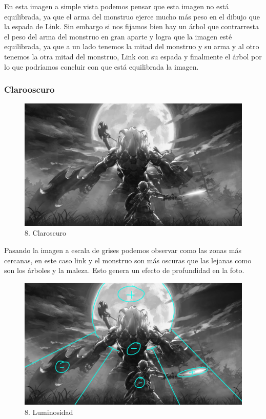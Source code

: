 \documentclass[12pt]{article}
\begin{document}
En esta imagen a simple vista podemos pensar que esta imagen no está equilibrada, ya que el arma del monstruo ejerce mucho más peso en el dibujo que la espada de Link. Sin embargo si nos fijamos bien hay un árbol que contrarresta el peso del arma del monstruo en gran aparte y logra que la imagen esté equilibrada, ya que a un lado tenemos la mitad del monstruo y su arma y al otro tenemos la otra mitad del monstruo, Link con su espada y finalmente el árbol por lo que podríamos concluir con que está equilibrada la imagen. 


        \subsubsection{Clarooscuro}

\begin{figure}[H]
      \centering
      \includegraphics[width=\textwidth]{images/Raúl/Sección 8/Imagen 8 gris.jpg}
      \caption{\small 8. Claroscuro}
    \end{figure}

 Pasando la imagen a escala de grises podemos observar como las zonas más cercanas, en este caso link y el monstruo son más oscuras que las lejanas como son los árboles y la maleza. Esto genera un efecto de profundidad en la foto.

\begin{figure}[H]
      \centering
      \includegraphics[width=\textwidth]{images/Raúl/Sección 8/Imagen 8 gris lumin.jpg}
      \caption{\small 8. Luminosidad}
    \end{figure}
\end{document}
